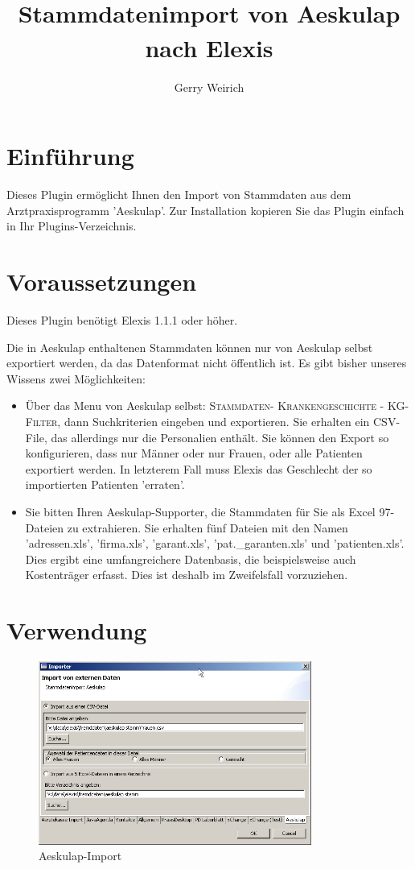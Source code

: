 \documentclass[a4paper]{scrartcl}
\title{Stammdatenimport von Aeskulap nach Elexis\textsuperscript{\textregistered}}
\author{Gerry Weirich}
\begin{document}
\maketitle
\section{Einführung}

Dieses Plugin ermöglicht Ihnen den Import von Stammdaten aus dem Arztpraxisprogramm 'Aeskulap'.
Zur Installation kopieren Sie das Plugin einfach in Ihr Plugins-Verzeichnis.

\section{Voraussetzungen}
Dieses Plugin benötigt Elexis 1.1.1 oder höher.

\medskip

Die in Aeskulap enthaltenen Stammdaten können nur von Aeskulap selbst exportiert werden, da das Datenformat nicht öffentlich ist. Es gibt bisher unseres Wissens zwei Möglichkeiten:
\begin{itemize}
  \item Über das Menu von Aeskulap selbst: \textsc{Stammdaten- Krankengeschichte - KG-Filter}, dann Suchkriterien eingeben und exportieren. Sie erhalten ein CSV-File, das allerdings nur die Personalien enthält. Sie können den Export so konfigurieren, dass nur Männer oder nur Frauen, oder alle Patienten exportiert werden. In letzterem Fall muss Elexis das Geschlecht der so importierten Patienten 'erraten'.
  \item Sie bitten Ihren Aeskulap-Supporter, die Stammdaten für Sie als Excel 97-Dateien zu extrahieren. Sie erhalten fünf Dateien mit den Namen 'adressen.xls', 'firma.xls', 'garant.xls', 'pat.\_garanten.xls' und 'patienten.xls'. Dies ergibt eine umfangreichere Datenbasis, die beispielsweise auch Kostenträger erfasst. Dies ist deshalb im Zweifelsfall vorzuziehen.
\end{itemize}

\section{Verwendung}

\begin{figure}
    \includegraphics[width=0.8\textwidth]{aeskulap}
    \caption{Aeskulap-Import}
    \label{fig:aeskulap}
\end{figure}
\end{document}
